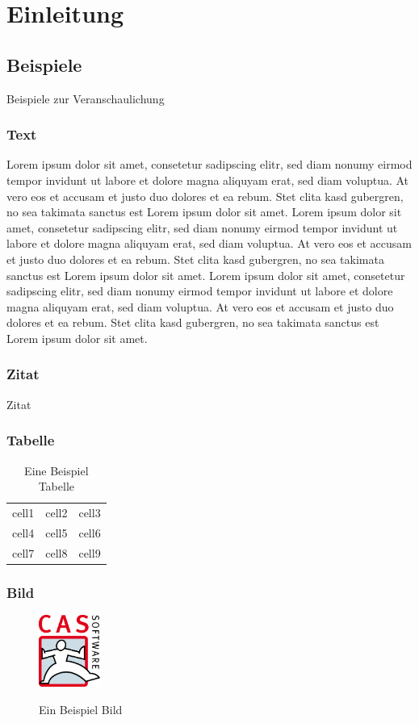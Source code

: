 
\chapter{Einleitung}

\section{Beispiele}
Beispiele zur Veranschaulichung

\subsection{Text}
Lorem ipsum dolor sit amet, consetetur sadipscing elitr, sed diam nonumy eirmod tempor invidunt ut labore et dolore magna aliquyam erat, sed diam voluptua. At vero eos et accusam et justo duo dolores et ea rebum. Stet clita kasd gubergren, no sea takimata sanctus est Lorem ipsum dolor sit amet. Lorem ipsum dolor sit amet, consetetur sadipscing elitr, sed diam nonumy eirmod tempor invidunt ut labore et dolore magna aliquyam erat, sed diam voluptua. At vero eos et accusam et justo duo dolores et ea rebum. Stet clita kasd gubergren, no sea takimata sanctus est Lorem ipsum dolor sit amet. Lorem ipsum dolor sit amet, consetetur sadipscing elitr, sed diam nonumy eirmod tempor invidunt ut labore et dolore magna aliquyam erat, sed diam voluptua. At vero eos et accusam et justo duo dolores et ea rebum. Stet clita kasd gubergren, no sea takimata sanctus est Lorem ipsum dolor sit amet.

\subsection{Zitat}
Zitat \cite{beispiel}

\subsection{Tabelle}
\begin{table}[H]
	\caption{Eine Beispiel Tabelle}
	\centering
	\begin{tabular}{ |c|c|c| } 
		\hline
		cell1 & cell2 & cell3 \\ 
		cell4 & cell5 & cell6 \\ 
		cell7 & cell8 & cell9 \\ 
		\hline
	\end{tabular}
	\label{Table:Beispiel}
\end{table}

\subsection{Bild}
\begin{figure}[H]
	\caption{Ein Beispiel Bild}
	\centering
	\includegraphics[width=2cm]{kapitel/0_offizielles/img/cas}
	\label{Image:Beispiel}
\end{figure}